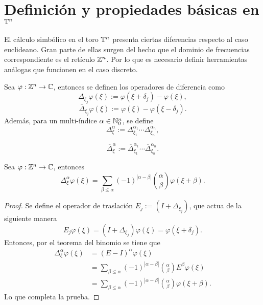 \section{Definición y propiedades básicas en $\mathbb{T}^n$}
El cálculo simbólico en el toro $\mathbb{T}^n$ presenta ciertas diferencias respecto al caso euclideano. Gran parte de ellas surgen del hecho que el dominio de frecuencias correspondiente es el retículo $\mathbb{Z}^n$. Por lo que es necesario definir herramientas análogas que funcionen en el caso discreto. 
\begin{definition}
	Sea $\varphi:\mathbb{Z}^n\to\mathbb{C}$, entonces se definen los operadores de diferencia como 
	\begin{equation*}
		\Delta_{\xi_j} \varphi(\xi) := \varphi(\xi + \delta_j) - \varphi(\xi),
	\end{equation*}
	\begin{equation*}
		\overline{\Delta}_{\xi_j} \varphi(\xi) := \varphi(\xi) - \varphi(\xi - \delta_j).
	\end{equation*}
	Además, para un multi-índice $\alpha\in\mathbb{N}^n_0$, se define 
	\begin{equation*}
		\Delta^\alpha_\xi := \Delta^{\alpha_1}_{\xi_1} \cdots \Delta^{\alpha_n}_{\xi_n},
	\end{equation*}
\end{definition}
\begin{equation*}
	\overline{\Delta}^\alpha_\xi := \overline{\Delta}^{\alpha_1}_{\xi_1} \cdots \overline{\Delta}^{\alpha_n}_{\xi_n}.
\end{equation*}
\begin{proposition}
	Sea $\varphi:\mathbb{Z}^n\to\mathbb{C}$, entonces 
	\begin{equation*}
		\Delta^\alpha_\xi \varphi(\xi) = \sum_{\beta\leq\alpha}(-1)^{|\alpha-\beta|} \binom{\alpha}{\beta}\varphi(\xi+\beta).
	\end{equation*}
\end{proposition}
\begin{proof}
	Se define el operador de traslación $E_j := (I+\Delta_{\xi_j})$, que actua de la siguiente manera
	\begin{equation*}
		E_j\varphi(\xi) = (I+\Delta_{\xi_j})\varphi(\xi) = \varphi(\xi +\delta_j).
	\end{equation*}
	Entonces, por el teorema del binomio se tiene que 
	\begin{align*}
		\Delta^\alpha_\xi\varphi(\xi) & = (E - I)^\alpha\varphi(\xi)\\
		& = \sum_{\beta\leq\alpha}(-1)^{|\alpha-\beta|}\binom{\alpha}{\beta}E^\beta\varphi(\xi) \\
		&  = \sum_{\beta\leq\alpha}(-1)^{|\alpha-\beta|} \binom{\alpha}{\beta}\varphi(\xi+\beta).
	\end{align*}
	Lo que completa la prueba.
\end{proof}

